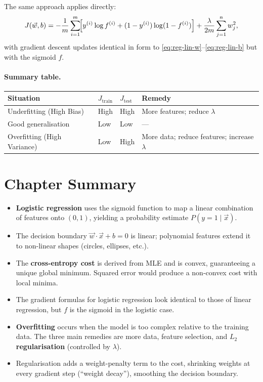 The same approach applies directly:
\begin{equation}
J(\vec{w},b)=-\frac{1}{m}\sum_{i=1}^m\!\Bigl[
y^{(i)}\log f^{(i)}+(1-y^{(i)})\log(1-f^{(i)})\Bigr]
+\frac{\lambda}{2m}\sum_{j=1}^n w_j^2,
\end{equation}
with gradient descent updates identical in form to
\eqref{eq:reg-lin-w}--\eqref{eq:reg-lin-b} but with the sigmoid $f$.

\paragraph{Summary table.}
\begin{center}
\begin{tabular}{llll}
\toprule
\textbf{Situation} & \textbf{$J_{\text{train}}$} &
\textbf{$J_{\text{test}}$} & \textbf{Remedy}\\
\midrule
Underfitting (High Bias)     & High  & High  & More features; reduce $\lambda$\\
Good generalisation          & Low   & Low   & ---\\
Overfitting (High Variance)  & Low   & High  & More data; reduce features; increase $\lambda$\\
\bottomrule
\end{tabular}
\end{center}

\section*{Chapter Summary}

\begin{itemize}
\item \textbf{Logistic regression} uses the sigmoid function to map a linear
  combination of features onto $(0,1)$, yielding a probability estimate
  $P(y=1\mid\vec{x})$.
\item The decision boundary $\vec{w}\cdot\vec{x}+b=0$ is linear; polynomial
  features extend it to non-linear shapes (circles, ellipses, etc.).
\item The \textbf{cross-entropy cost} is derived from MLE and is convex,
  guaranteeing a unique global minimum. Squared error would produce a
  non-convex cost with local minima.
\item The gradient formulas for logistic regression look identical to those of
  linear regression, but $f$ is the sigmoid in the logistic case.
\item \textbf{Overfitting} occurs when the model is too complex relative to the
  training data. The three main remedies are more data, feature selection, and
  $L_2$ \textbf{regularisation} (controlled by $\lambda$).
\item Regularisation adds a weight-penalty term to the cost, shrinking weights
  at every gradient step (``weight decay''), smoothing the decision boundary.
\end{itemize}
